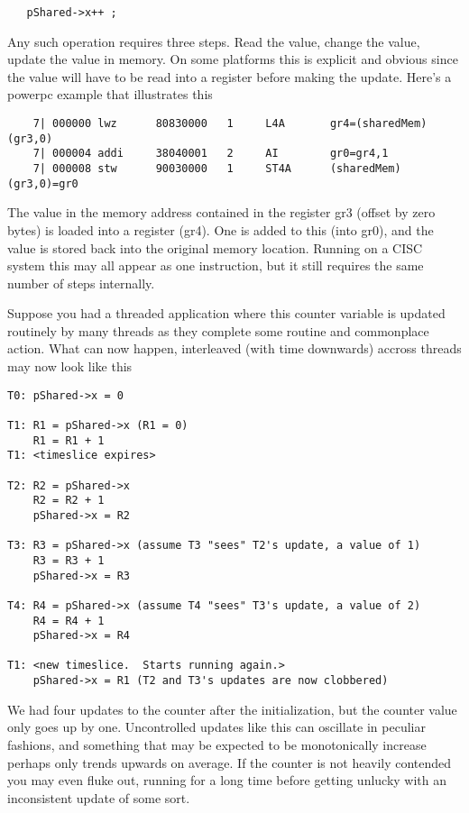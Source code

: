 \begin{lstlisting}
   pShared->x++ ;
\end{lstlisting}

Any such operation requires three steps.  Read the value, change the value, update the value in memory.  On some platforms this is explicit and obvious since the value will have to be read into a register before making the update.  Here's a powerpc example that illustrates this

\begin{lstlisting}
    7| 000000 lwz      80830000   1     L4A       gr4=(sharedMem)(gr3,0)
    7| 000004 addi     38040001   2     AI        gr0=gr4,1
    7| 000008 stw      90030000   1     ST4A      (sharedMem)(gr3,0)=gr0
\end{lstlisting}

The value in the memory address contained in the register gr3 (offset by zero bytes) is loaded into a register (gr4).  One is added to this (into gr0), and the value is stored back into the original memory location.  Running on a CISC system this may all appear as one instruction, but it still requires the same number of steps internally.

Suppose you had a threaded application where this counter variable is updated routinely by many threads as they complete some routine and commonplace action.  What can now happen, interleaved (with time downwards) accross threads may now look like this

\begin{lstlisting}
T0: pShared->x = 0

T1: R1 = pShared->x (R1 = 0)
    R1 = R1 + 1
T1: <timeslice expires>

T2: R2 = pShared->x
    R2 = R2 + 1
    pShared->x = R2

T3: R3 = pShared->x (assume T3 "sees" T2's update, a value of 1)
    R3 = R3 + 1
    pShared->x = R3

T4: R4 = pShared->x (assume T4 "sees" T3's update, a value of 2)
    R4 = R4 + 1
    pShared->x = R4

T1: <new timeslice.  Starts running again.>
    pShared->x = R1 (T2 and T3's updates are now clobbered)
\end{lstlisting}

We had four updates to the counter after the initialization, but the counter value only goes up by one.  Uncontrolled updates like this can oscillate in peculiar fashions, and something that may be expected to be monotonically increase perhaps only trends upwards on average.  If the counter is not heavily contended you may even fluke out, running for a long time before getting unlucky with an inconsistent update of some sort.

